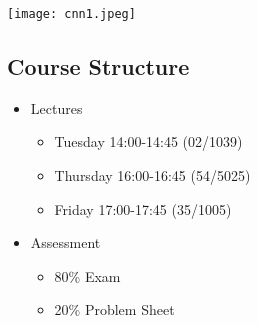 
\vspace{-1cm}
\begin{center}
\noindent\texttt{[image: cnn1.jpeg]}
\end{center}
\renewcommand{\Outline}{%
\begin{slide}
\section[1]{Outline}

\begin{minipage}{12cm}\raggedright
  \begin{enumerate}\squeeze
    \outlineitem{Course Outline}{outline}
  \end{enumerate}
\end{minipage}\hfill
\begin{minipage}{10cm}
  \texttt{[image: cnn1.jpeg]}
\end{minipage}
\end{slide}
\addtocounter{outlineitem}{1}
}

\setcounter{outlineitem}{1}



\begin{slide}
\section{Course Structure}

\begin{PauseHighLight}
  \begin{itemize}
  \item Lectures
    \begin{itemize}
    \item Tuesday 14:00-14:45 (02/1039)
    \item Thursday 16:00-16:45 (54/5025)
    \item Friday 17:00-17:45 (35/1005) \pause
    \end{itemize}
  \item Assessment
    \begin{itemize}
    \item 80\% Exam
    \item 20\% Problem Sheet\pause
    \end{itemize}
  \end{itemize}
\end{PauseHighLight}

\end{slide}

